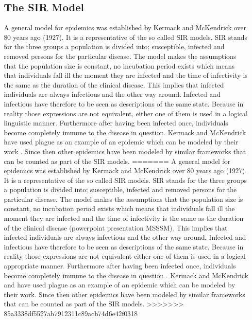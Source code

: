 \documentclass[11pt]{article}
\begin{document}
\subsection{The SIR Model}
A general model for epidemics was established by Kermack and McKendrick over 80 years ago (1927). It is a representative of the so called SIR models. SIR stands for the three groups a population is divided into; susceptible, infected and removed persons for the particular disease. The model makes the assumptions that the population size is constant, no incubation period exists which means that individuals fall ill the moment they are infected and the time of infectivity is the same as the duration of the clinical disease. This implies that infected individuals are always infectious and the other way around. Infected and infectious have therefore to be seen as descriptions of the same state. Because in reality those expressions are not equivalent, either one of them is used in a logical linguistic manner. Furthermore after having been infected once, individuals become completely immune to the disease in question. Kermack and McKendrick have used plague as an example of an epidemic which can be modeled by their work \cite{kermack:1927}. Since then other epidemics have been modeled by similar frameworks that can be counted as part of the SIR models.
=======
A general model for epidemics was established by Kermack and McKendrick over 80 years ago (1927). It is a representative of the so called SIR models. SIR stands for the three groups a population is divided into; susceptible, infected and removed persons for the particular disease. The model makes the assumptions that the population size is constant, no incubation period exists which means that individuals fall ill the moment they are infected and the time of infectivity is the same as the duration of the clinical disease (powerpoint presentation MSSSM). This implies that infected individuals are always infectious and the other way around. Infected and infectious have therefore to be seen as descriptions of the same state. Because in reality those expressions are not equivalent either one of them is used in a logical appropriate manner. Furthermore after having been infected once, individuals become completely immune to the disease in question \cite{kermack:1927}. Kermack and McKendrick and have used plague as an example of an epidemic which can be modeled by their work. Since then other epidemics have been modeled by similar frameworks that can be counted as part of the SIR models.
>>>>>>> 85a3338df5527ab7912311c89acb74d6e42f0318
\end{document}
